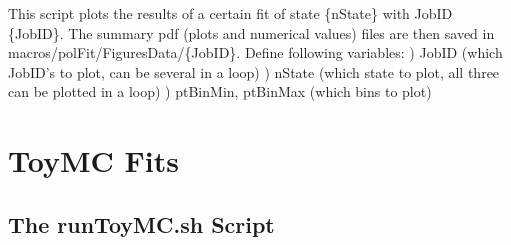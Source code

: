 \documentclass{article}
\begin{document}
This script plots the results of a certain fit of state \{nState\} with JobID \{JobID\}. The summary pdf (plots and numerical values) files are then saved in macros/polFit/FiguresData/\{JobID\}. Define following variables:
\newline *) JobID (which JobID's to plot, can be several in a loop)
\newline *) nState (which state to plot, all three can be plotted in a loop)
\newline *) ptBinMin, ptBinMax (which bins to plot)


\section{ToyMC Fits}

\subsection{The runToyMC.sh Script}
\end{document}
